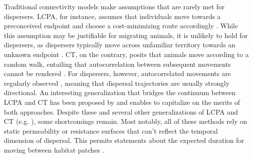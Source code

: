 \documentclass[abstract=on,10pt,a4paper,bibliography=totocnumbered]{article}
\begin{document}
Traditional connectivity models make assumptions that are rarely met for
dispersers. LCPA, for instance, assumes that individuals move towards a
preconceived endpoint and choose a cost-minimizing route accordingly
\citep{Sawyer.2011, Abrahms.2017}. While this assumption may be justifiable for
migrating animals, it is unlikely to hold for dispersers, as dispersers
typically move across unfamiliar territory towards an unknown endpoint
\citep{Koen.2014, Cozzi.2020}. CT, on the contrary, posits that animals move
according to a random walk, entailing that autocorrelation between subsequent
movements cannot be rendered \citep{Diniz.2019}. For dispersers, however,
autocorrelated movements are regularly observed \citep{Cozzi.2020,
Hofmann.2021}, meaning that dispersal trajectories are usually strongly
directional. An interesting generalization that bridges the continuum between
LCPA and CT has been proposed by \citep{Panzacchi.2016} and enables to
capitalize on the merits of both approaches. Despite these and several other
generalizations of LCPA and CT (e.g. \citealp{Pinto.2009, Landguth.2012,
Panzacchi.2016, Brennan.2020}), some shortcomings remain. Most notably, all of
these methods rely on static permeability or resistance surfaces that can't
reflect the temporal dimension of dispersal. This permits statements about the
expected duration for moving between habitat patches \citep{Martensen.2017,
Diniz.2019}.
\end{document}

